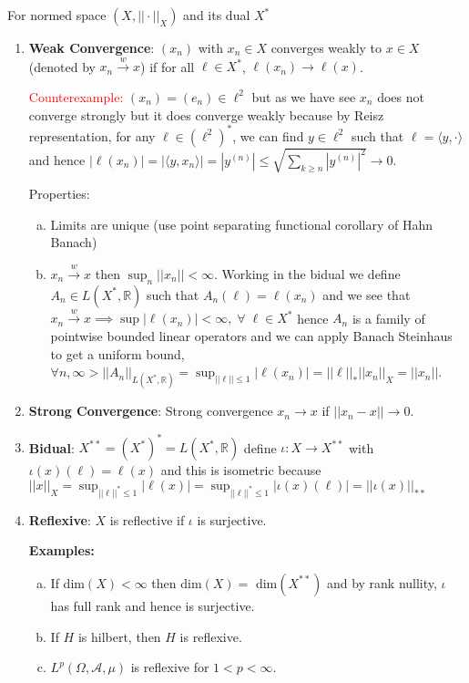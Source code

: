 \documentclass{article}
\begin{document}
For normed space \((X, ||\cdot||_X)\) and its dual \(X^*\)

\begin{enumerate}
    \item \textbf{Weak Convergence}: \((x_n)\) with \(x_n \in X\) converges weakly to \(x \in X\) (denoted by \(x_n \overset{w}{\to} x\)) if for all \(\ell \in X^*\), \(\ell(x_n) \to \ell(x)\). 

    \textcolor{red}{Counterexample:} \((x_n) = (e_n) \in \ell^2\) but as we have see \(x_n\) does not converge strongly but it does converge weakly because by Reisz representation, for any \(\ell \in (\ell^2)^*\),  we can find \(y \in \ell^2\) such that \(\ell = \langle y, \cdot \rangle\) and hence \(|\ell(x_n)| = |\langle y, x_n\rangle| = |y^{(n)}|\leq \sqrt{\sum_{k\geq n}|y^{(n)}|^2} \to 0\).

    Properties:
    \begin{enumerate} [a.]
        \item Limits are unique (use point separating functional corollary of Hahn Banach)
        \item \(x_n \overset{w}{\to} x\) then \(\sup_n ||x_n|| < \infty\). Working in the bidual we define \(A_n \in L(X^*, \mathbb{R})\) such that \(A_n(\ell) = \ell(x_n)\) and we see that \(x_n \overset{w}{\to} x \implies \sup|\ell(x_n)| < \infty, \; \forall \; \ell \in X^*\) hence \(A_n \) is a family of pointwise bounded linear operators and we can apply Banach Steinhaus to get a uniform bound, \(\forall n, \infty > ||A_n||_{L(X^*, \mathbb{R}) }=\sup_{||\ell|| \leq 1} |\ell(x_n)| = ||\ell||_*||x_n||_X = ||x_n||\).
    \end{enumerate}

    \item \textbf{Strong Convergence}: Strong convergence \(x_n \to x\) if \(||x_n - x|| \to 0\).

    \item \textbf{Bidual}: \(X^{**} = (X^*)^* = L(X^*, \mathbb{R})\) define \(\iota :  X\to X^{**}\) with \(\iota(x)(\ell) = \ell(x)\) and this is isometric because \(||x||_X = \sup_{||\ell||^* \leq 1} |\ell(x)|= \sup_{||\ell||^* \leq 1} |\iota(x)(\ell)| = ||\iota(x)||_{**}\)
    
    \item \textbf{Reflexive}: \(X\) is reflective if \(\iota\) is surjective.

    \textbf{Examples:}
    \begin{enumerate} [a.]
        \item If dim\((X)<\infty\) then dim\((X) = \) dim\((X^{**})\) and by rank nullity, \(\iota\) has full rank and hence is surjective.
        \item If \(H\) is hilbert, then \(H\) is reflexive.
        \item \(L^p(\Omega, \mathcal{A}, \mu)\) is reflexive for \(1<p<\infty\).
    \end{enumerate}


\end{enumerate}
\end{document}
